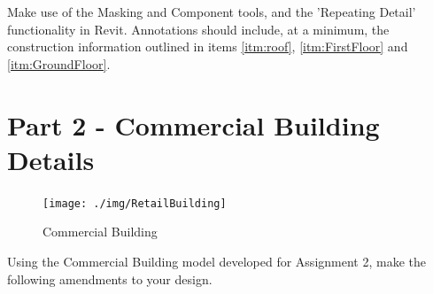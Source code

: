 Make use of the Masking and Component tools, and the 'Repeating Detail' functionality in Revit.  Annotations should include, at a minimum, the construction information outlined in items \ref{itm:roof}, \ref{itm:FirstFloor} and \ref{itm:GroundFloor}. 






\newpage

\section*{Part 2 - Commercial Building Details}

\begin{figure}
	\centering
	\texttt{[image: ./img/RetailBuilding]}
	\caption{Commercial Building}
	\label{fig:retailbuilding}
\end{figure}



Using the Commercial Building model developed for Assignment 2, make the following amendments to your design. 

